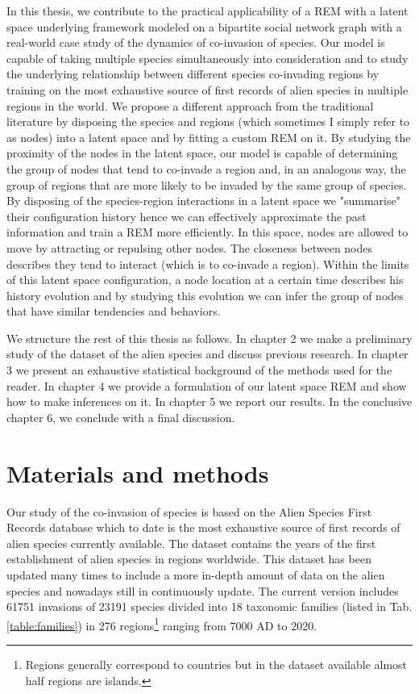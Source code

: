 \documentclass[mscthesis]{usiinfthesis}
\begin{document}


In this thesis, we contribute to the practical applicability of a REM with a latent space underlying framework modeled on a bipartite social network graph with a real-world case study of the dynamics of co-invasion of species. Our model is capable of taking multiple species simultaneously into consideration and to study the underlying relationship between different species co-invading regions by training on the most exhaustive source of first records of alien species in multiple regions in the world. We propose a different approach from the traditional literature by disposing the species and regions (which sometimes I simply refer to as nodes) into a latent space and by fitting a custom REM on it. By studying the proximity of the nodes in the latent space, our model is capable of determining the group of nodes that tend to co-invade a region and, in an analogous way, the group of regions that are more likely to be invaded by the same group of species.  By disposing of the species-region interactions in a latent space we "summarise" their configuration history hence we can effectively approximate the past information and train a REM more efficiently. In this space, nodes are allowed to move by attracting or repulsing other nodes. The closeness between nodes describes they tend to interact (which is to co-invade a region). Within the limits of this latent space configuration, a node location at a certain time describes his history evolution and by studying this evolution we can infer the group of nodes that have similar tendencies and behaviors.


We structure the rest of this thesis as follows. In chapter 2 we make a preliminary study of the dataset of the alien species and discuss previous research. In chapter 3 we present an exhaustive statistical background of the methods used for the reader. In chapter 4 we provide a formulation of our latent space REM and show how to make inferences on it. In chapter 5 we report our results. In the conclusive chapter 6, we conclude with a final discussion.



\chapter{Materials and methods}
\label{sec:dataset}
Our study of the co-invasion of species is based on the Alien Species First Records database \cite{intro:dataset} which to date is the most exhaustive source of first records of alien species currently available. The dataset contains the years of the first establishment of alien species in regions worldwide. This dataset has been updated many times to include a more in-depth amount of data on the alien species \cite{intro:datasetv2} and nowadays still in continuously update. The current version includes 61751 invasions of 23191 species divided into 18 taxonomic families (listed in Tab. \ref{table:families}) in 276 regions\footnote{Regions generally correspond to countries but in the dataset available almost half regions are islands.} ranging from 7000 AD to 2020.
\end{document}
